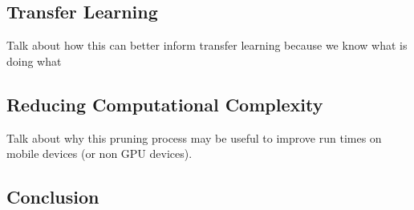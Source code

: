 \documentclass[10pt,twocolumn,letterpaper]{article}
\begin{document}
\subsection{Transfer Learning}

Talk about how this can better inform transfer learning because we know what is doing what

\subsection{Reducing Computational Complexity}
Talk about why this pruning process may be useful to improve run times on mobile devices (or non GPU devices).

\subsection{Conclusion}



{\small


}
\end{document}
